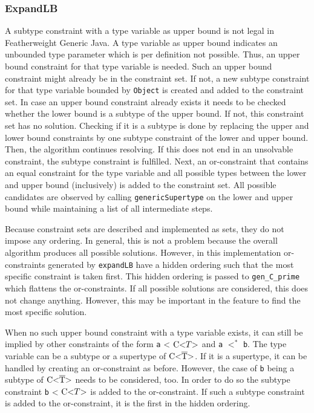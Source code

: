 \subsubsection{ExpandLB}
A subtype constraint with a type variable as upper bound is not legal in Featherweight Generic Java. A type variable as upper bound indicates an unbounded type parameter which is per definition not possible.
Thus, an upper bound constraint for that type variable is needed. Such an upper bound constraint might already be in the constraint set. If not, a new subtype constraint for that type variable bounded by \verb|Object| is created and added to the constraint set.
In case an upper bound constraint already exists it needs to be checked whether the lower bound is a subtype of the upper bound. If not, this constraint set has no solution. Checking if it is a subtype is done by replacing the upper and lower bound constraints by one subtype constraint of the lower and upper bound. Then, the algorithm continues resolving. If this does not end in an unsolvable constraint, the subtype constraint is fulfilled.
Next, an or-constraint that contains an equal constraint for the type variable and all possible types between the lower and upper bound (inclusively) is added to the constraint set. All possible candidates are observed by calling \verb|genericSupertype| on the lower and upper bound while maintaining a list of all intermediate steps.

Because constraint sets are described and implemented as sets, they do not impose any ordering. In general, this is not a problem because the overall algorithm produces all possible solutions. However, in this implementation or-constraints generated by \verb|expandLB| have a hidden ordering such that the most specific constraint is taken first.
This hidden ordering is passed to \verb|gen_C_prime| which flattens the or-constraints. If all possible solutions are considered, this does not change anything.
However, this may be important in the feature to find the most specific solution.

When no such upper bound constraint with a type variable exists, it can still be implied by other constraints of the form \verb|a| < $\text{C} \text{<} T \text{>}$ and \verb|a| $<^*$ \verb|b|. The type variable can be a subtype or a supertype of $\text{C<}\overline{\text{T}}\text{>}$. If it is a supertype, it can be handled by creating an or-constraint as before. However, the case of \verb|b| being a subtype of $\text{C<}\overline{\text{T}}\text{>}$ needs to be considered, too.
In order to do so the subtype constraint \verb|b| < $\text{C} \text{<} T \text{>}$ is added to the or-constraint. If such a subtype constraint is added to the or-constraint, it is the first in the hidden ordering.

